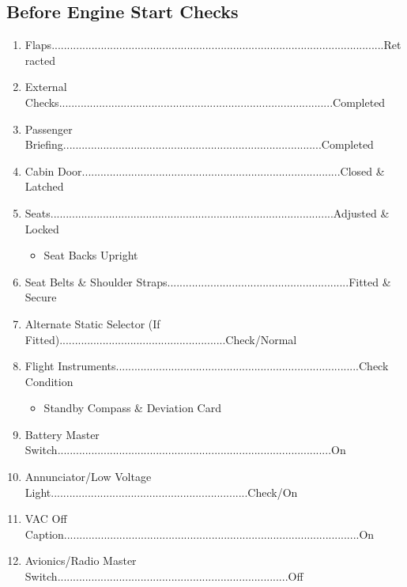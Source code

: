 \documentclass[a4paper]{article}
\newenvironment{checklist}{
  \begin{itemize}[leftmargin=*, align=left]
    \setlength{\itemsep}{2pt}
    \setlength{\parskip}{0pt}
    \setlength{\parsep}{0pt}
}{
  \end{itemize}
}
\newenvironment{numberedchecklist}{
  \begin{enumerate}[label=\arabic*., leftmargin=*, align=left]
    \setlength{\itemsep}{2pt}
    \setlength{\parskip}{0pt}
    \setlength{\parsep}{0pt}
}{
  \end{enumerate}
}
\begin{document}
\subsection*{Before Engine Start Checks}
\begin{numberedchecklist}
\item Flaps............................................................................................................Retracted
\item External Checks.........................................................................................Completed
\item Passenger Briefing....................................................................................Completed
\item Cabin Door....................................................................................Closed \& Latched
\item Seats............................................................................................Adjusted \& Locked
  \begin{checklist}
  \item Seat Backs Upright
  \end{checklist}
\item Seat Belts \& Shoulder Straps...........................................................Fitted \& Secure
\item Alternate Static Selector (If Fitted)......................................................Check/Normal
\item Flight Instruments...............................................................................Check Condition
  \begin{checklist}
  \item Standby Compass \& Deviation Card
  \end{checklist}
\item Battery Master Switch.........................................................................................On
\item Annunciator/Low Voltage Light................................................................Check/On
\item VAC Off Caption................................................................................................On
\item Avionics/Radio Master Switch...........................................................................Off
\end{numberedchecklist}
\end{document}
